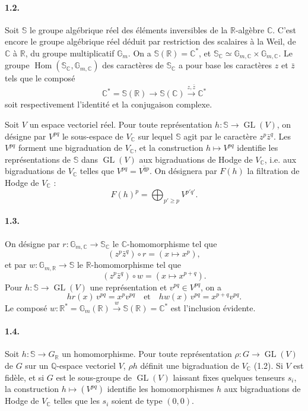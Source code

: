 \documentclass[10pt]{article}
\newcommand{\C}{\mathbb C}
\newcommand{\Gm}{\mathbb G_m}
\newcommand{\Q}{\mathbb Q}
\newcommand{\R}{\mathbb R}
\newcommand{\bS}{\mathbb S}
\newcommand{\GL}{\operatorname{GL}}
\newcommand{\Hom}{\operatorname{Hom}}
\begin{document}
\paragraph{1.2.} Soit $\bS$ le groupe algébrique réel des éléments inversibles de la $\R$-algèbre $\C$. C'est encore le groupe algébrique réel déduit par restriction des scalaires à la Weil, de $\C$ à $\R$, du groupe multiplicatif $\Gm$. On a $\bS(\R)=\C^*$, et $\bS_\C\simeq\mathbb G_{m,\C}\times\mathbb G_{m,\C}$. Le groupe $\Hom(\bS_\C,\mathbb G_{m,\C})$ des caractères de $\bS_\C$ a pour base les caractères $z$ et $\bar z$ tels que le composé
\[
\C^*=\bS(\R)\longrightarrow \bS(\C)\xrightarrow{z,\bar z}\C^*
\]
soit respectivement l'identité et la conjugaison complexe.

Soit $V$ un espace vectoriel réel. Pour toute représentation $h:\bS\to\GL(V)$, on désigne par $V^{pq}$ le sous-espace de $V_\C$ sur lequel $\bS$ agit par le caractère $z^p\bar z^q$. Les $V^{pq}$ forment une bigraduation de $V_\C$, et la construction $h\mapsto V^{pq}$ identifie les représentations de $\bS$ dans $\GL(V)$ aux bigraduations de Hodge de $V_\C$, i.e. aux bigraduations de $V_\C$ telles que $V^{pq}=\overline{V^{qp}}$. On désignera par $F(h)$ la filtration de Hodge de $V_\C$ :
\[
F(h)^p=\bigoplus_{p'\ge p}V^{p'q'}.
\]

\paragraph{1.3.} On désigne par $r:\mathbb G_{m,\C}\to\bS_\C$ le $\C$-homomorphisme tel que
\[
(z^p\bar z^q)\circ r=(x\longmapsto x^p),
\]
et par $w:\mathbb G_{m,\R}\to\bS$ le $\R$-homomorphisme tel que
\[
(z^p\bar z^q)\circ w=(x\longmapsto x^{p+q}).
\]
Pour $h:\bS\to\GL(V)$ une représentation et $v^{pq}\in V^{pq}$, on a
\[
hr(x)\,v^{pq}=x^p v^{pq}\quad\text{et}\quad hw(x)\,v^{pq}=x^{p+q}v^{pq}.
\]
Le composé $w:\R^*=\mathbb G_m(\R)\xrightarrow{w}\bS(\R)=\C^*$ est l'inclusion évidente.

\paragraph{1.4.} Soit $h:\bS\to G_\R$ un homomorphisme. Pour toute représentation $\rho:G\to\GL(V)$ de $G$ sur un $\Q$-espace vectoriel $V$, $\rho h$ définit une bigraduation de $V_\C$ (1.2). Si $V$ est fidèle, et si $G$ est le sous-groupe de $\GL(V)$ laissant fixes quelques tenseurs $s_i$, la construction $h\mapsto(V^{pq})$ identifie les homomorphismes $h$ aux bigraduations de Hodge de $V_\C$ telles que les $s_i$ soient de type $(0,0)$.
\end{document}
